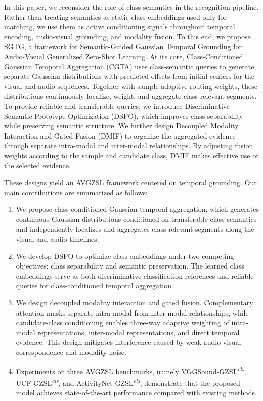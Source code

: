 In this paper, we reconsider the role of class semantics in the recognition pipeline. Rather than treating semantics as static class embeddings used only for matching, we use them as active conditioning signals throughout temporal encoding, audio-visual grounding, and modality fusion. To this end, we propose SGTG, a framework for Semantic-Guided Gaussian Temporal Grounding for Audio-Visual Generalized Zero-Shot Learning. At its core, Class-Conditioned Gaussian Temporal Aggregation (CGTA) uses class-semantic queries to generate separate Gaussian distributions with predicted offsets from initial centers for the visual and audio sequences. Together with sample-adaptive routing weights, these distributions continuously localize, weight, and aggregate class-relevant segments. To provide reliable and transferable queries, we introduce Discriminative Semantic Prototype Optimization (DSPO), which improves class separability while preserving semantic structure. We further design Decoupled Modality Interaction and Gated Fusion (DMIF) to organize the aggregated evidence through separate intra-modal and inter-modal relationships. By adjusting fusion weights according to the sample and candidate class, DMIF makes effective use of the selected evidence.

These designs yield an AVGZSL framework centered on temporal grounding. Our main contributions are summarized as follows:

\begin{enumerate}
\renewcommand{\labelenumi}{(\arabic{enumi})}

\item We propose class-conditioned Gaussian temporal aggregation, which generates continuous Gaussian distributions conditioned on transferable class semantics and independently localizes and aggregates class-relevant segments along the visual and audio timelines.

\item We develop DSPO to optimize class embeddings under two competing objectives: class separability and semantic preservation. The learned class embeddings serve as both discriminative classification references and reliable queries for class-conditioned temporal aggregation.

\item We design decoupled modality interaction and gated fusion. Complementary attention masks separate intra-modal from inter-modal relationships, while candidate-class conditioning enables three-way adaptive weighting of intra-modal representations, inter-modal representations, and direct temporal evidence. This design mitigates interference caused by weak audio-visual correspondence and modality noise.

\item Experiments on three AVGZSL benchmarks, namely VGGSound-GZSL\textsuperscript{\textit{cls}}, UCF-GZSL\textsuperscript{\textit{cls}}, and ActivityNet-GZSL\textsuperscript{\textit{cls}}, demonstrate that the proposed model achieves state-of-the-art performance compared with existing methods.

\end{enumerate}
